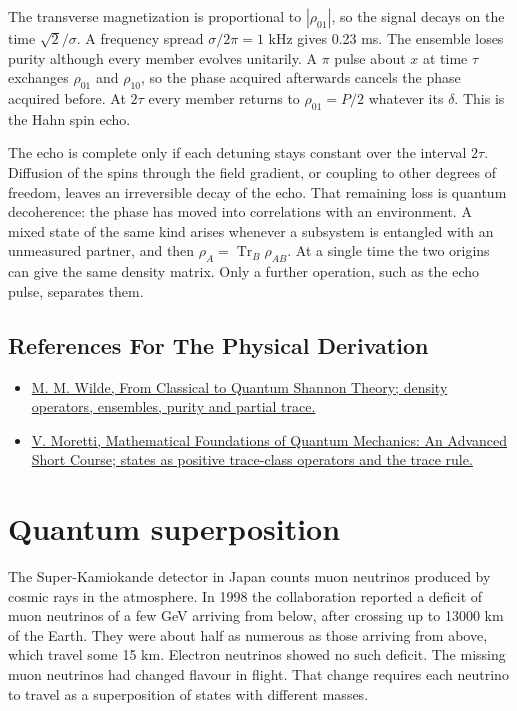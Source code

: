 \documentclass[11pt,oneside]{book}
\begin{document}
The transverse magnetization is proportional to \(|\rho_{01}|\), so the signal decays on the time \(\sqrt2/\sigma\). A frequency spread \(\sigma/2\pi=1\) kHz gives 0.23 ms. The ensemble loses purity although every member evolves unitarily. A \(\pi\) pulse about \(x\) at time \(\tau\) exchanges \(\rho_{01}\) and \(\rho_{10}\), so the phase acquired afterwards cancels the phase acquired before. At \(2\tau\) every member returns to \(\rho_{01}=P/2\) whatever its \(\delta\). This is the Hahn spin echo.

The echo is complete only if each detuning stays constant over the interval \(2\tau\). Diffusion of the spins through the field gradient, or coupling to other degrees of freedom, leaves an irreversible decay of the echo. That remaining loss is quantum decoherence: the phase has moved into correlations with an environment. A mixed state of the same kind arises whenever a subsystem is entangled with an unmeasured partner, and then \(\rho_A=\operatorname{Tr}_B\rho_{AB}\). At a single time the two origins can give the same density matrix. Only a further operation, such as the echo pulse, separates them.

\subsection*{References For The Physical Derivation}
\begin{itemize}
\item \href{https://arxiv.org/abs/1106.1445}{M. M. Wilde, From Classical to Quantum Shannon Theory; density operators, ensembles, purity and partial trace.}
\item \href{https://arxiv.org/abs/1508.06951}{V. Moretti, Mathematical Foundations of Quantum Mechanics: An Advanced Short Course; states as positive trace-class operators and the trace rule.}
\end{itemize}





\clearpage

\section{Quantum superposition}

\label{topic:quantum-superposition}

The Super-Kamiokande detector in Japan counts muon neutrinos produced by cosmic rays in the atmosphere. In 1998 the collaboration reported a deficit of muon neutrinos of a few GeV arriving from below, after crossing up to 13000 km of the Earth. They were about half as numerous as those arriving from above, which travel some 15 km. Electron neutrinos showed no such deficit. The missing muon neutrinos had changed flavour in flight. That change requires each neutrino to travel as a superposition of states with different masses.
\end{document}
